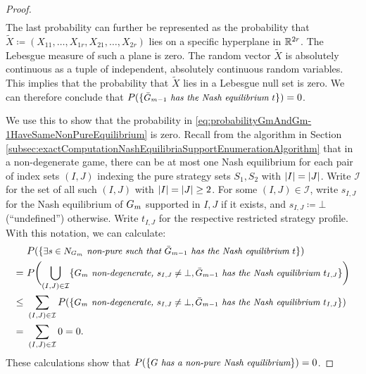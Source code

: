 \documentclass[a4paper,DIV=11]{scrreprt}
\theoremstyle{definition}
\begin{document}
\begin{proof}[Proof]
\begin{gather*}
        \end{gather*}
        The last probability can further be represented as the probability that $\tilde{X} \coloneqq (X_{11}, \dots, X_{1r}, X_{21}, \dots, X_{2r})$ lies on a specific hyperplane in $\mathbb{R}^{2r}$. The Lebesgue measure of such a plane is zero. The random vector $\tilde{X}$ is absolutely continuous as a tuple of independent, absolutely continuous random variables. This implies that the probability that $\tilde{X}$ lies in a Lebesgue null set is zero.
        We can therefore conclude that $P(\{\textit{\small$\bar{G}_{m-1}$ has the Nash equilibrium $t$}\}) = 0$.
        
        We use this to show that the probability in \eqref{eq:probabilityGmAndGm-1HaveSameNonPureEquilibrium} is zero.
        Recall from the algorithm in Section \ref{subsec:exactComputationNashEquilibriaSupportEnumerationAlgorithm} that in a non-degenerate game, there can be at most one Nash equilibrium for each pair of index sets $(I, J)$ indexing the pure strategy sets $S_1, S_2$ with $\left| I \right| = \left| J \right|$.
        Write $\mathcal{I}$ for the set of all such $(I, J)$ with $\left| I \right| = \left| J \right| \geq 2$.
        For some $(I, J) \in \mathcal{I}$, write $s_{I,J}$ for the Nash equilibrium of $G_{m}$ supported in $I, J$ if it exists, and $s_{I,J} \coloneqq \bot$ (“undefined”) otherwise. Write $t_{I,J}$ for the respective restricted strategy profile.
        With this notation, we can calculate:
        \begin{align*}
                 &P(\{\textit{\small$\exists s \in N_{G_{m}}$ non-pure such that $\bar{G}_{m-1}$ has the Nash equilibrium $t$}\}) \\
                 =~ &P\biggl(\bigcup_{(I, J) \in \mathcal{I}}\{\textit{\small $G_{m}$ non-degenerate, $s_{I, J} \neq \bot, \bar{G}_{m-1}$ has the Nash equilibrium $t_{I, J}$}\}\biggr) \\
            \leq~ &\sum_{(I, J) \in \mathcal{I}} 
                P(\{\textit{\small $G_{m}$ non-degenerate, $s_{I, J} \neq \bot, \bar{G}_{m-1}$ has the Nash equilibrium $t_{I, J}$}\}) \\
                =~ &\sum_{(I, J) \in \mathcal{I}} 0 = 0.
        \end{align*}
        These calculations show that $P(\{\textit{\small $G$ has a non-pure Nash equilibrium}\}) = 0$.
    \end{proof}
\end{document}
